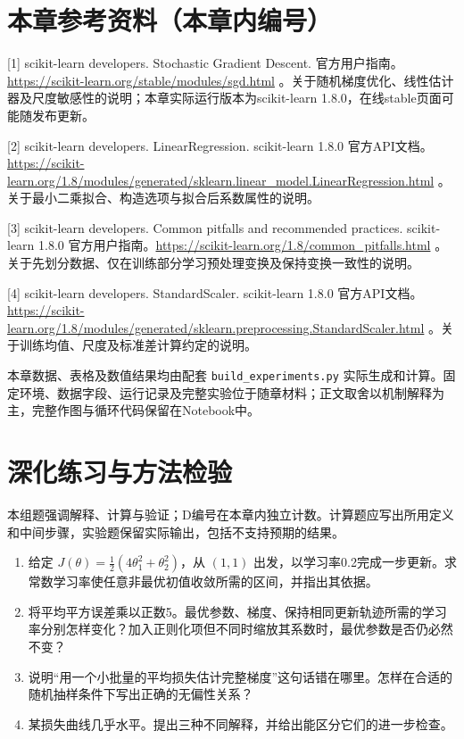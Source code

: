 \section*{本章参考资料（本章内编号）}

{[}1{]} scikit-learn developers. Stochastic Gradient Descent. 官方用户指南。\url{https://scikit-learn.org/stable/modules/sgd.html} 。关于随机梯度优化、线性估计器及尺度敏感性的说明；本章实际运行版本为scikit-learn 1.8.0，在线stable页面可能随发布更新。

{[}2{]} scikit-learn developers. LinearRegression. scikit-learn 1.8.0 官方API文档。\url{https://scikit-learn.org/1.8/modules/generated/sklearn.linear_model.LinearRegression.html} 。关于最小二乘拟合、构造选项与拟合后系数属性的说明。

{[}3{]} scikit-learn developers. Common pitfalls and recommended practices. scikit-learn 1.8.0 官方用户指南。\url{https://scikit-learn.org/1.8/common_pitfalls.html} 。关于先划分数据、仅在训练部分学习预处理变换及保持变换一致性的说明。

{[}4{]} scikit-learn developers. StandardScaler. scikit-learn 1.8.0 官方API文档。\url{https://scikit-learn.org/1.8/modules/generated/sklearn.preprocessing.StandardScaler.html} 。关于训练均值、尺度及标准差计算约定的说明。

本章数据、表格及数值结果均由配套 \texttt{build\_experiments.py} 实际生成和计算。固定环境、数据字段、运行记录及完整实验位于随章材料；正文取舍以机制解释为主，完整作图与循环代码保留在Notebook中。

\section*{深化练习与方法检验}
本组题强调解释、计算与验证；D编号在本章内独立计数。计算题应写出所用定义和中间步骤，实验题保留实际输出，包括不支持预期的结果。
\begin{enumerate}[label=D\arabic*.]
\item 给定 $J(\theta)=\frac12(4\theta_1^2+\theta_2^2)$，从 $(1,1)$ 出发，以学习率0.2完成一步更新。求常数学习率使任意非最优初值收敛所需的区间，并指出其依据。
\item 将平均平方误差乘以正数5。最优参数、梯度、保持相同更新轨迹所需的学习率分别怎样变化？加入正则化项但不同时缩放其系数时，最优参数是否仍必然不变？
\item 说明“用一个小批量的平均损失估计完整梯度”这句话错在哪里。怎样在合适的随机抽样条件下写出正确的无偏性关系？
\item 某损失曲线几乎水平。提出三种不同解释，并给出能区分它们的进一步检查。
\end{enumerate}
